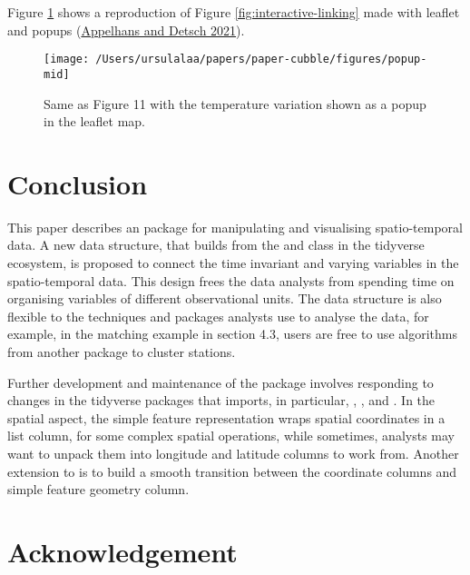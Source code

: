 \documentclass{article}
\begin{document}
Figure \ref{fig:interactive-popup} shows a reproduction of Figure \ref{fig:interactive-linking} made with leaflet and popups (\protect\hyperlink{ref-leafpop}{Appelhans and Detsch 2021}).

\begin{figure}

{\centering \texttt{[image: /Users/ursulalaa/papers/paper-cubble/figures/popup-mid]} 

}

\caption{Same as Figure 11 with the temperature variation shown as a popup in the leaflet map.}\label{fig:interactive-popup}
\end{figure}

\hypertarget{conclude}{%
\section{Conclusion}\label{conclude}}

This paper describes an  package  for manipulating and visualising spatio-temporal data. A new data structure,  that builds from the  and  class in the tidyverse ecosystem, is proposed to connect the time invariant and varying variables in the spatio-temporal data. This design frees the data analysts from spending time on organising variables of different observational units. The data structure is also flexible to the techniques and packages analysts use to analyse the data, for example, in the matching example in section 4.3, users are free to use algorithms from another package to cluster stations.

Further development and maintenance of the package involves responding to changes in the tidyverse packages that  imports, in particular, , , and . In the spatial aspect, the simple feature representation wraps spatial coordinates in a list column, for some complex spatial operations, while sometimes, analysts may want to unpack them into longitude and latitude columns to work from. Another extension to  is to build a smooth transition between the coordinate columns and simple feature geometry column.

\newpage

\hypertarget{acknowledgement}{%
\section{Acknowledgement}\label{acknowledgement}}
\end{document}
